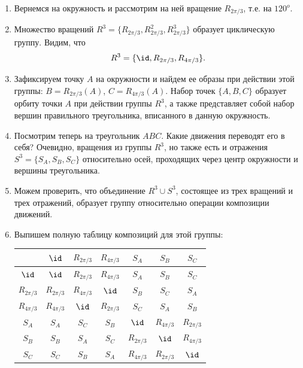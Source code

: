 \begin{enumerate}
\item Вернемся на окружность и рассмотрим на ней вращение $R_{2\pi/3}$, т.е. на $120^o$.
\item Множество вращений $R^3=\{R_{2\pi/3},R_{2\pi/3}^2,R_{2\pi/3}^3\}$ образует циклическую группу. Видим, что
$$
R^3 = \{\id,R_{2\pi/3},R_{4\pi/3}\}.
$$
\item Зафиксируем точку $A$ на окружности и найдем ее образы при действии этой группы: $B=R_{2\pi/3}(A)$, $C=R_{4\pi/3}(A)$. Набор точек $\{A,B,C\}$ образует орбиту точки $A$ при действии группы $R^3$, а также представляет собой набор вершин правильного треугольника, вписанного в данную окружность.
\item Посмотрим теперь на треугольник $ABC$. Какие движения переводят его в себя? Очевидно, вращения из группы $R^3$, но также есть и отражения $S^3=\{S_A, S_B, S_C\}$ относительно осей, проходящих через центр окружности и вершины треугольника.
\item Можем проверить, что объединение $R^3\cup S^3$, состоящее из трех вращений и трех отражений, образует группу относительно операции композиции движений.
\item Выпишем полную таблицу композиций для этой группы:
\begin{table}[htb!]\begin{center}
\begin{tabular}{c||c|c|c||c|c|c|}
             & $\id$        & $R_{2\pi/3}$ & $R_{4\pi/3}$ & $S_A$        & $S_B$        & $S_C$  \\
\hline\hline
$\id$        & $\id$        & $R_{2\pi/3}$ & $R_{4\pi/3}$ & $S_A$        & $S_B$        & $S_C$  \\  \hline
$R_{2\pi/3}$ & $R_{2\pi/3}$ & $R_{4\pi/3}$ & $\id$        & $S_B$        & $S_C$        & $S_A$  \\  \hline
$R_{4\pi/3}$ & $R_{4\pi/3}$ & $\id$        & $R_{2\pi/3}$ & $S_C$        & $S_A$        & $S_B$  \\  \hline\hline
$S_A$        & $S_A$        & $S_C$        & $S_B$        & $\id$        & $R_{4\pi/3}$ & $R_{2\pi/3}$  \\  \hline
$S_B$        & $S_B$        & $S_A$        & $S_C$        & $R_{2\pi/3}$ & $\id$        & $R_{4\pi/3}$  \\  \hline
$S_C$        & $S_C$        & $S_B$        & $S_A$        & $R_{4\pi/3}$ & $R_{2\pi/3}$ & $\id$   \\  \hline
\end{tabular}
\end{center}\end{table}


\end{enumerate}
